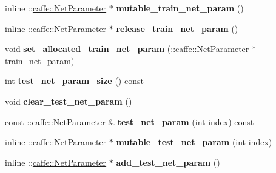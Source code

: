 \begin{DoxyCompactItemize}
inline \+::\mbox{\hyperlink{classcaffe_1_1_net_parameter}{caffe\+::\+Net\+Parameter}} $\ast$ {\bfseries mutable\+\_\+train\+\_\+net\+\_\+param} ()
\item 
\mbox{\label{classcaffe_1_1_solver_parameter_a9cbb42be1c92c83425230f394b276a3d}} 
inline \+::\mbox{\hyperlink{classcaffe_1_1_net_parameter}{caffe\+::\+Net\+Parameter}} $\ast$ {\bfseries release\+\_\+train\+\_\+net\+\_\+param} ()
\item 
\mbox{\label{classcaffe_1_1_solver_parameter_add4025bbe077733b4050fa6b0f3e08f8}} 
void {\bfseries set\+\_\+allocated\+\_\+train\+\_\+net\+\_\+param} (\+::\mbox{\hyperlink{classcaffe_1_1_net_parameter}{caffe\+::\+Net\+Parameter}} $\ast$train\+\_\+net\+\_\+param)
\item 
\mbox{\label{classcaffe_1_1_solver_parameter_a99f6ba944ba55d2052aac6ee2d041155}} 
int {\bfseries test\+\_\+net\+\_\+param\+\_\+size} () const
\item 
\mbox{\label{classcaffe_1_1_solver_parameter_aed6cb6dc198fe8c38447444989102517}} 
void {\bfseries clear\+\_\+test\+\_\+net\+\_\+param} ()
\item 
\mbox{\label{classcaffe_1_1_solver_parameter_aee7203247b01c01dcba08dd0eaee0b2a}} 
const \+::\mbox{\hyperlink{classcaffe_1_1_net_parameter}{caffe\+::\+Net\+Parameter}} \& {\bfseries test\+\_\+net\+\_\+param} (int index) const
\item 
\mbox{\label{classcaffe_1_1_solver_parameter_a8e3a02e4338d823a61adecb1d3e7594a}} 
inline \+::\mbox{\hyperlink{classcaffe_1_1_net_parameter}{caffe\+::\+Net\+Parameter}} $\ast$ {\bfseries mutable\+\_\+test\+\_\+net\+\_\+param} (int index)
\item 
\mbox{\label{classcaffe_1_1_solver_parameter_a373a17bacbb82a6f1ddace6ae5f9c008}} 
inline \+::\mbox{\hyperlink{classcaffe_1_1_net_parameter}{caffe\+::\+Net\+Parameter}} $\ast$ {\bfseries add\+\_\+test\+\_\+net\+\_\+param} ()
\item 
\mbox{\label{classcaffe_1_1_solver_parameter_aaf454f9fc1cf3f1ad3055bdba4a6570e}} 

\end{DoxyCompactItemize}
